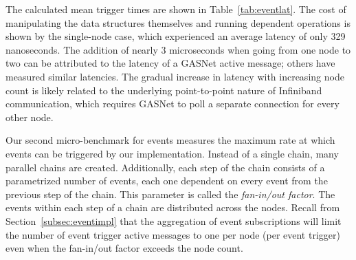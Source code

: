 
The calculated mean trigger times are shown in Table~\ref{tab:eventlat}.
The cost of manipulating the data structures themselves and running dependent
operations is shown by the single-node case, which experienced an average
latency of only 329 nanoseconds.  The addition of nearly 3 microseconds when
going from one node to two can be attributed to the latency of a GASNet
active message; others have measured similar latencies\cite{GASNET06}.
The gradual increase in latency with increasing node count is likely 
related to the underlying point-to-point nature of Infiniband communication,
which requires GASNet to poll a separate connection for every other node.

Our second micro-benchmark for events measures the maximum rate at which events can
be triggered by our implementation.  Instead of a single chain, many parallel chains
are created.  Additionally, each step of the chain consists of a parametrized number
of events, each one dependent on every event from the previous step of the chain.
This parameter is called the {\em fan-in/out factor}.  The events within each step of
a chain are distributed across the nodes.  Recall from Section~\ref{subsec:eventimpl}
that the aggregation of event subscriptions
will limit the number of event trigger active messages to one per node (per event trigger)
even when the fan-in/out factor exceeds the node count.


